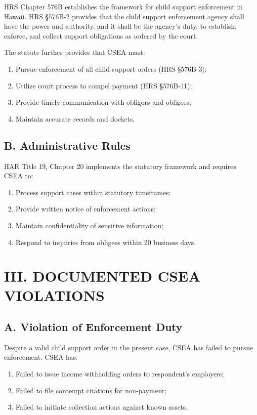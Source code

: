 \documentclass[12pt]{article}
\begin{document}
HRS Chapter 576B establishes the framework for child support enforcement in Hawaii. HRS \S 576B-2 provides that the child support enforcement agency shall have the power and authority, and it shall be the agency's duty, to establish, enforce, and collect support obligations as ordered by the court.

The statute further provides that CSEA must:
\begin{enumerate}
\item Pursue enforcement of all child support orders (HRS \S 576B-3);
\item Utilize court process to compel payment (HRS \S 576B-11);
\item Provide timely communication with obligors and obligees;
\item Maintain accurate records and dockets.
\end{enumerate}

\subsection*{B. Administrative Rules}

HAR Title 19, Chapter 20 implements the statutory framework and requires CSEA to:
\begin{enumerate}
\item Process support cases within statutory timeframes;
\item Provide written notice of enforcement actions;
\item Maintain confidentiality of sensitive information;
\item Respond to inquiries from obligees within 20 business days.
\end{enumerate}

\section*{III. DOCUMENTED CSEA VIOLATIONS}

\subsection*{A. Violation of Enforcement Duty}

Despite a valid child support order in the present case, CSEA has failed to pursue enforcement. CSEA has:
\begin{enumerate}
\item Failed to issue income withholding orders to respondent's employers;
\item Failed to file contempt citations for non-payment;
\item Failed to initiate collection actions against known assets.
\end{enumerate}
\end{document}
